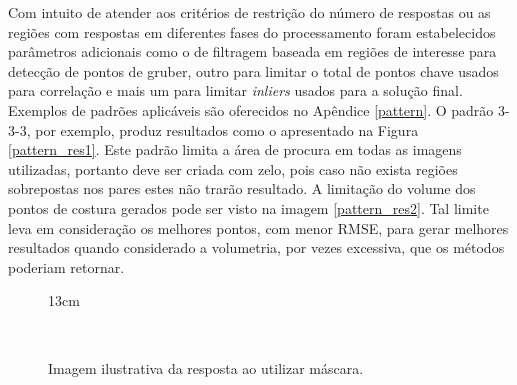 Com intuito de atender aos critérios de restrição do número de respostas ou as regiões com respostas em diferentes fases do processamento foram estabelecidos parâmetros adicionais como o de filtragem baseada em regiões de interesse para detecção de pontos de gruber, outro para limitar o total de pontos chave usados para correlação e mais um para limitar \textit{inliers} usados para a solução final. Exemplos de padrões aplicáveis são oferecidos no Apêndice \ref{pattern}. O padrão 3-3-3, por exemplo, produz resultados como o apresentado na Figura \ref{pattern_res1}. Este padrão limita a área de procura em todas as imagens utilizadas, portanto deve ser criada com zelo, pois caso não exista regiões sobrepostas nos pares estes não trarão resultado.
A limitação do volume dos pontos de costura gerados pode ser visto na imagem \ref{pattern_res2}. Tal limite leva em consideração os melhores pontos, com menor RMSE, para gerar melhores resultados quando considerado a volumetria, por vezes excessiva, que os métodos poderiam retornar.

\begin{figure}[]{13cm}
  \caption{Imagem ilustrativa da resposta ao utilizar máscara.} \label{patterns_res}
  \hfill
  \\
\end{figure}

